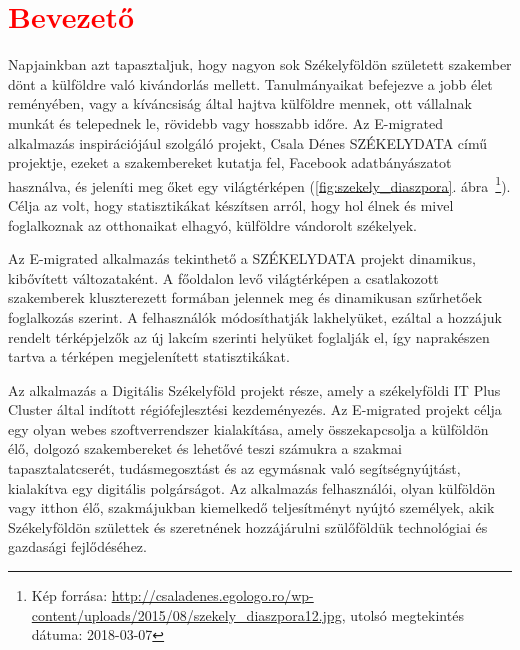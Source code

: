 \chapter*{\textcolor{red}{Bevezető}}

Napjainkban azt tapasztaljuk, hogy nagyon sok Székelyföldön született szakember dönt a külföldre való kivándorlás mellett. Tanulmányaikat befejezve a jobb élet reményében, vagy a kíváncsiság által hajtva külföldre mennek, ott vállalnak munkát és telepednek le, rövidebb vagy hosszabb időre. Az E-migrated alkalmazás inspirációjául szolgáló projekt, Csala Dénes SZÉKELYDATA című projektje, ezeket a szakembereket kutatja fel, Facebook adatbányászatot használva, és jeleníti meg őket egy világtérképen (\ref{fig:szekely_diaszpora}. ábra~\footnote{Kép forrása: \url{http://csaladenes.egologo.ro/wp-content/uploads/2015/08/szekely_diaszpora12.jpg}, utolsó megtekintés dátuma: 2018-03-07}). Célja az volt, hogy statisztikákat készítsen arról, hogy hol élnek és mivel foglalkoznak az otthonaikat elhagyó, külföldre vándorolt székelyek. 

Az E-migrated alkalmazás tekinthető a SZÉKELYDATA projekt dinamikus, kibővített változataként. A főoldalon levő világtérképen a csatlakozott szakemberek kluszterezett formában jelennek meg és dinamikusan szűrhetőek foglalkozás szerint. A felhasználók módosíthatják lakhelyüket, ezáltal a hozzájuk rendelt térképjelzők az új lakcím szerinti helyüket foglalják el, így naprakészen tartva a térképen  megjelenített statisztikákat. 

Az alkalmazás a Digitális Székelyföld projekt része, amely  a székelyföldi IT Plus Cluster által indított régiófejlesztési kezdeményezés. Az E-migrated projekt célja egy olyan webes szoftverrendszer kialakítása, amely összekapcsolja a külföldön élő, dolgozó szakembereket és lehetővé teszi számukra a szakmai tapasztalatcserét, tudásmegosztást és az egymásnak való segítségnyújtást, kialakítva egy digitális polgárságot. Az alkalmazás felhasználói, olyan külföldön vagy itthon élő, szakmájukban kiemelkedő teljesítményt nyújtó személyek, akik Székelyföldön születtek és szeretnének hozzájárulni szülőföldük technológiai és gazdasági fejlődéséhez. 

